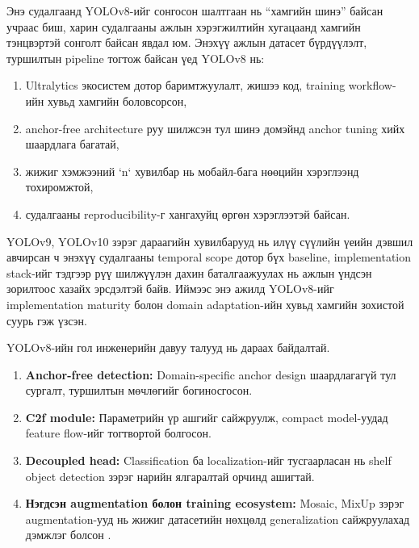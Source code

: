 Энэ судалгаанд YOLOv8-ийг сонгосон шалтгаан нь ``хамгийн шинэ'' байсан учраас биш, харин судалгааны ажлын хэрэгжилтийн хугацаанд хамгийн тэнцвэртэй сонголт байсан явдал юм. Энэхүү ажлын датасет бүрдүүлэлт, туршилтын pipeline тогтож байсан үед YOLOv8 нь:

\begin{enumerate}
\item Ultralytics экосистем дотор баримтжуулалт, жишээ код, training workflow-ийн хувьд хамгийн боловсорсон,
\item anchor-free architecture руу шилжсэн тул шинэ домэйнд anchor tuning хийх шаардлага багатай,
\item жижиг хэмжээний `n` хувилбар нь мобайл-бага нөөцийн хэрэглээнд тохиромжтой,
\item судалгааны reproducibility-г хангахуйц өргөн хэрэглээтэй байсан.
\end{enumerate}

YOLOv9, YOLOv10 зэрэг дараагийн хувилбарууд нь илүү сүүлийн үеийн дэвшил авчирсан ч энэхүү судалгааны temporal scope дотор бүх baseline, implementation stack-ийг тэдгээр рүү шилжүүлэн дахин баталгаажуулах нь ажлын үндсэн зорилтоос хазайх эрсдэлтэй байв. Иймээс энэ ажилд YOLOv8-ийг implementation maturity болон domain adaptation-ийн хувьд хамгийн зохистой суурь гэж үзсэн.

YOLOv8-ийн гол инженерийн давуу талууд нь дараах байдалтай.

\begin{enumerate}
\item \textbf{Anchor-free detection:} Domain-specific anchor design шаардлагагүй тул сургалт, туршилтын мөчлөгийг богиносгосон.
\item \textbf{C2f module:} Параметрийн үр ашгийг сайжруулж, compact model-уудад feature flow-ийг тогтвортой болгосон.
\item \textbf{Decoupled head:} Classification ба localization-ийг тусгаарласан нь shelf object detection зэрэг нарийн ялгаралтай орчинд ашигтай.
\item \textbf{Нэгдсэн augmentation болон training ecosystem:} Mosaic, MixUp зэрэг augmentation-ууд нь жижиг датасетийн нөхцөлд generalization сайжруулахад дэмжлэг болсон \cite{data_augmentation}.
\end{enumerate}

